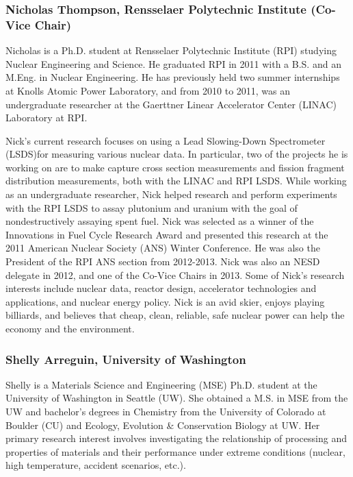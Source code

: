 \subsubsection*{Nicholas Thompson, Rensselaer Polytechnic Institute (Co-Vice Chair)}

Nicholas is a Ph.D. student at Rensselaer Polytechnic Institute (RPI) studying
Nuclear Engineering and Science. He graduated RPI in 2011 with a B.S. and an
M.Eng. in Nuclear Engineering. He has previously held two summer internships at
Knolls Atomic Power Laboratory, and from 2010 to 2011, was an undergraduate
researcher at the Gaerttner Linear Accelerator Center (LINAC) Laboratory at RPI.

Nick's current research focuses on using a Lead Slowing-Down Spectrometer
(LSDS)for measuring various nuclear data. In particular, two of the projects he
is working on are to make capture cross section measurements and fission
fragment distribution measurements, both with the LINAC and RPI LSDS. While
working as an undergraduate researcher, Nick helped research and perform
experiments with the RPI LSDS to assay plutonium and uranium with the goal of
nondestructively assaying spent fuel. Nick was selected as a winner of the
Innovations in Fuel Cycle Research Award and presented this research at the 2011
American Nuclear Society (ANS) Winter Conference. He was also the President of
the RPI ANS section from 2012-2013. Nick was also an NESD delegate in 2012, and
one of the Co-Vice Chairs in 2013. Some of Nick's research interests include
nuclear data, reactor design, accelerator technologies and applications, and
nuclear energy policy. Nick is an avid skier, enjoys playing billiards, and
believes that cheap, clean, reliable, safe nuclear power can help the economy
and the environment.

\subsubsection*{Shelly Arreguin, University of Washington}

Shelly is a Materials Science and Engineering (MSE) Ph.D. student at the
University of Washington in Seattle (UW). She obtained a M.S. in MSE from the UW
and bachelor's degrees in Chemistry from the University of Colorado at Boulder
(CU) and Ecology, Evolution \& Conservation Biology at UW. Her primary research
interest involves investigating the relationship of processing and properties of
materials and their performance under extreme conditions (nuclear, high
temperature, accident scenarios, etc.).

